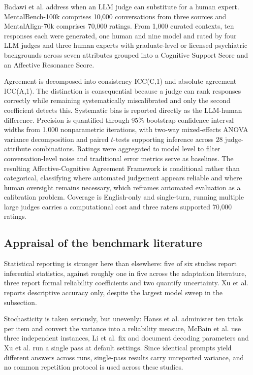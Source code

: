 \documentclass[11pt]{article}
\begin{document}
	Badawi et al.\cite{badawi-etal-2026-trust} address when an LLM judge can substitute for a human expert. MentalBench-100k comprises 10,000 conversations from three sources and MentalAlign-70k comprises 70,000 ratings. From 1,000 curated contexts, ten responses each were generated, one human and nine model and rated by four LLM judges and three human experts with graduate-level or licensed psychiatric backgrounds across seven attributes grouped into a Cognitive Support Score and an Affective Resonance Score.
	
	Agreement is decomposed into consistency ICC(C,1) and absolute agreement ICC(A,1). The distinction is consequential because a judge can rank responses correctly while remaining systematically miscalibrated and only the second coefficient detects this. Systematic bias is reported directly as the LLM-human difference. Precision is quantified through 95\% bootstrap confidence interval widths from 1,000 nonparametric iterations, with two-way mixed-effects ANOVA variance decomposition and paired $t$-tests supporting inference across 28 judge-attribute combinations. Ratings were aggregated to model level to filter conversation-level noise and traditional error metrics serve as baselines. The resulting Affective-Cognitive Agreement Framework is conditional rather than categorical, classifying where automated judgement appears reliable and where human oversight remains necessary, which reframes automated evaluation as a calibration problem. Coverage is English-only and single-turn, running multiple large judges carries a computational cost and three raters supported 70,000 ratings.
	
	\subsection{Appraisal of the benchmark literature}
	
	Statistical reporting is stronger here than elsewhere: five of six studies report inferential statistics, against roughly one in five across the adaptation literature, three report formal reliability coefficients and two quantify uncertainty. Xu et al.\cite{Xu2025} reports descriptive accuracy only, despite the largest model sweep in the subsection.
	
	Stochasticity is taken seriously, but unevenly: Hanss et al. administer ten trials per item and convert the variance into a reliability measure, McBain et al.\cite{MCBAIN2025} use three independent instances, Li et al. fix and document decoding parameters and Xu et al.\cite{Xu2025} run a single pass at default settings. Since identical prompts yield different answers across runs, single-pass results carry unreported variance, and no common repetition protocol is used across these studies.
	
\end{document}
